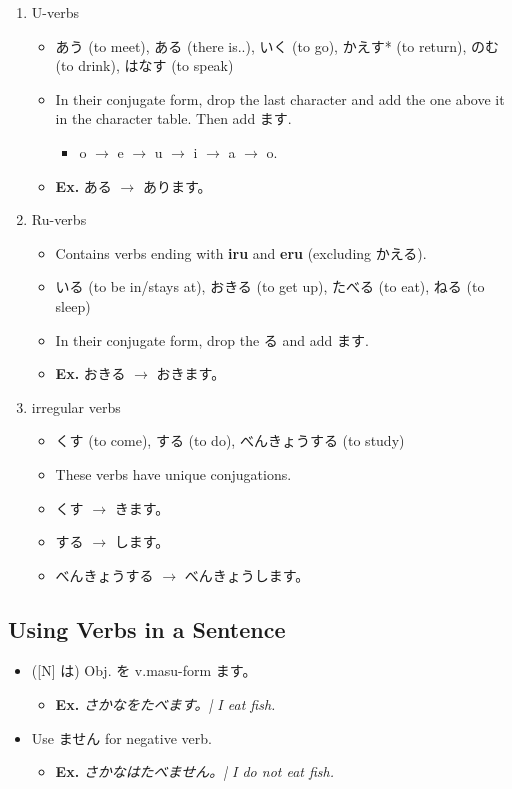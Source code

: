 \documentclass{article}
\begin{document}
\begin{CJK}{UTF8}{min}
\begin{enumerate}
\item U-verbs
\begin{itemize}
\item あう (to meet), ある (there is..), いく (to go), かえす* (to return), のむ (to drink), はなす (to speak)
\item In their conjugate form, drop the last character and add the one above it in the character table. Then add ます.
\begin{itemize}
\item o $\rightarrow$ e $\rightarrow$ u $\rightarrow$ i $\rightarrow$ a $\rightarrow$ o.
\end{itemize}
\item {\bf Ex.} ある $\rightarrow$ あります。
\end{itemize}
\item Ru-verbs
\begin{itemize}
\item Contains verbs ending with {\bf iru} and {\bf eru} (excluding かえる).
\item いる (to be in/stays at), おきる (to get up), たべる (to eat), ねる (to sleep)
\item In their conjugate form, drop the る and add ます.
\item {\bf Ex.} おきる $\rightarrow$ おきます。
\end{itemize}
\item irregular verbs
\begin{itemize}
\item くす (to come), する (to do), べんきょうする (to study)
\item These verbs have unique conjugations.
\item くす $\rightarrow$ きます。
\item する $\rightarrow$ します。
\item べんきょうする $\rightarrow$ べんきょうします。
\end{itemize}
\end{enumerate}

\subsection{Using Verbs in a Sentence}

\begin{itemize}
\item ([N] は) Obj. を v.masu-form ます。
\begin{itemize}
\item {\bf Ex.} {\it さかなをたべます。| I eat fish.}
\end{itemize}
\item Use ません for negative verb.
\begin{itemize}
\item {\bf Ex.} {\it さかなはたべません。| I do not eat fish.}
\end{itemize}
\end{itemize}


\end{CJK}
\end{document}
